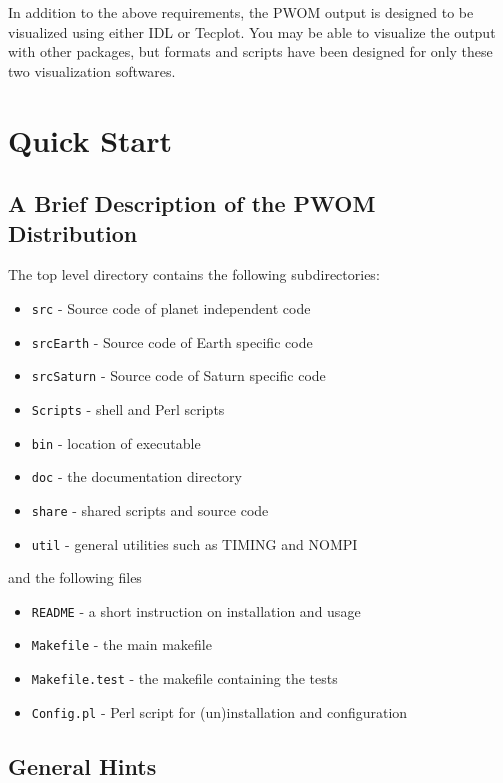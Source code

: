 In addition to the above requirements, the PWOM output is designed to
be visualized using either IDL or Tecplot.  You may be able to
visualize the output with other packages, but formats and scripts have
been designed for only these two visualization softwares.



\chapter{Quick Start}

\section{A Brief Description of the PWOM Distribution}

The top level directory contains the following subdirectories:
\begin{itemize}
\item {\tt src}       - Source code of planet independent code
\item {\tt srcEarth}  - Source code of Earth specific code      
\item {\tt srcSaturn} - Source code of Saturn specific code 
\item {\tt Scripts}   - shell and Perl scripts
\item {\tt bin}       - location of executable
\item {\tt doc}       - the documentation directory 
\item {\tt share}     - shared scripts and source code
\item {\tt util}      - general utilities such as TIMING and NOMPI
\end{itemize}
and the following files
\begin{itemize}
\item {\tt README}        - a short instruction on installation and usage
\item {\tt Makefile}      - the main makefile
\item {\tt Makefile.test} - the makefile containing the tests 
\item {\tt Config.pl}     - Perl script for (un)installation and configuration
\end{itemize}

\section{General Hints}

